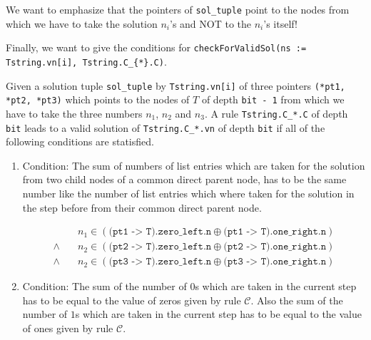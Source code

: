 \begin{remark}
    We want to emphasize that the pointers of \texttt{sol\_tuple} point to the nodes from which we have to take the solution $n_{i}$'s and NOT to the $n_{i}$'s itself!
\label{remark:soltuplepointers}
\end{remark}

Finally, we want to give the conditions for \texttt{checkForValidSol(ns := Tstring.vn[i], Tstring.C\_\{*\}.C)}.

\begin{definition}
    Given a solution tuple \texttt{sol\_tuple} by \texttt{Tstring.vn[i]} of three pointers \texttt{(*pt1, *pt2, *pt3)} which points to the nodes of $T$ of depth \texttt{bit - 1} from which we have to take the three numbers $n_{1}$, $n_{2}$ and $n_{3}$. A rule \texttt{Tstring.C\_*.C} of depth \texttt{bit} leads to a valid solution of \texttt{Tstring.C\_{*}.vn} of depth \texttt{bit} if all of the following conditions are statisfied.
    
    \begin{enumerate}
        \item Condition: The sum of numbers of list entries which are taken for the solution from two child nodes of a common direct parent node, has to be the same number like the number of list entries which where taken for the solution in the step before from their common direct parent node.

            \begin{equation}
                \begin{split}
                                & n_{1} \in \left(\texttt{(pt1 -> T).zero\_left.n} \oplus \texttt{(pt1 -> T).one\_right.n}\right)\\
                    \wedge \quad & n_{2} \in \left(\texttt{(pt2 -> T).zero\_left.n} \oplus \texttt{(pt2 -> T).one\_right.n}\right)\\
                    \wedge \quad & n_{2} \in \left(\texttt{(pt3 -> T).zero\_left.n} \oplus \texttt{(pt3 -> T).one\_right.n}\right)
                \label{eq:numberofentriestakenparentchild}
                \end{split}
            \end{equation}

        \item Condition: The sum of the number of $0$s which are taken in the current step has to be equal to the value of zeros given by rule $\mathcal{C}$. Also the sum of the number of $1$s which are taken in the current step has to be equal to the value of ones given by rule $\mathcal{C}$.


\end{enumerate}
\end{definition}
